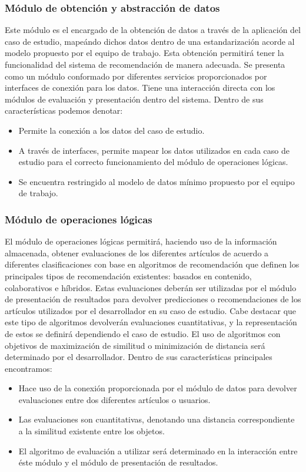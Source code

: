 \subsubsection{Módulo de obtención y abstracción de datos}
Este módulo es el encargado de la obtención de datos a través de la aplicación del caso de estudio, mapeándo dichos datos dentro de una estandarización acorde al modelo propuesto por el equipo de trabajo. Esta obtención permitirá tener la funcionalidad del sistema de recomendación de manera adecuada. 
Se presenta como un módulo conformado por diferentes servicios proporcionados por interfaces de conexión para los datos. Tiene una interacción directa con los módulos de evaluación y presentación dentro del sistema.
Dentro de sus características podemos denotar:
\begin{itemize}
	\item Permite la conexión a los datos del caso de estudio.
	\item A través de interfaces, permite mapear los datos utilizados en cada caso de estudio para el correcto funcionamiento del módulo de operaciones lógicas.
	\item Se encuentra restringido al modelo de datos mínimo propuesto por el equipo de trabajo.
\end{itemize}

\subsubsection{Módulo de operaciones lógicas}
El módulo de operaciones lógicas permitirá, haciendo uso de la información almacenada, obtener evaluaciones de los diferentes artículos de acuerdo a diferentes clasificaciones con base en algoritmos de recomendación que definen los principales tipos de recomendación existentes: basados en contenido, colaborativos e híbridos. Estas evaluaciones deberán ser utilizadas por el módulo de presentación de resultados para devolver predicciones o recomendaciones de los artículos utilizados por el desarrollador en su caso de estudio. Cabe destacar que este tipo de algoritmos devolverán evaluaciones cuantitativas, y la representación de estos se definirá dependiendo el caso de estudio. El uso de algoritmos con objetivos de maximización de similitud o minimización de distancia será determinado por el desarrollador. Dentro de sus características principales encontramos:
\begin{itemize}
	\item Hace uso de la conexión proporcionada por el módulo de datos para devolver evaluaciones entre dos diferentes artículos o usuarios.
	\item Las evaluaciones son cuantitativas, denotando una distancia correspondiente a la similitud existente entre los objetos.
	\item El algoritmo de evaluación a utilizar será determinado en la interacción entre éste módulo y el módulo de presentación de resultados.
\end{itemize}

